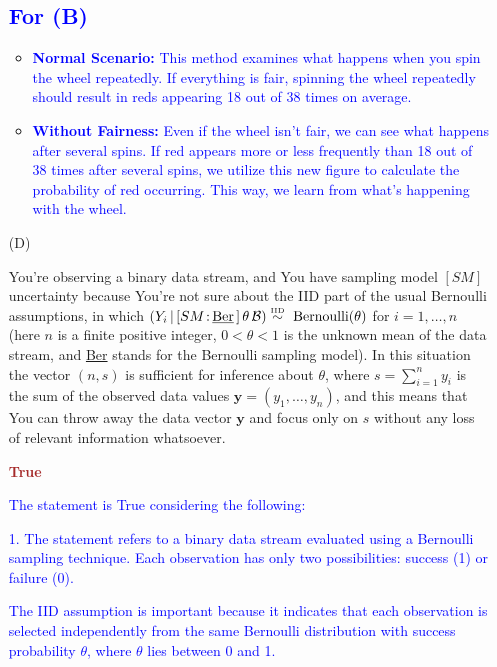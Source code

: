 \documentclass[12pt]{article}
\newcommand{\given}{\, | \,}
\renewcommand{\r}[1]{\text{#1}}
\renewcommand{\u}[1]{\underline{#1}}
\begin{document}
\begin{itemize}
\subsection*{\textcolor{blue}{\textbf{For (B)}}}

\begin{itemize}
    \item \textbf{\textcolor{blue}{Normal Scenario:}} \textcolor{blue}{This method examines what happens when you spin the wheel repeatedly. If everything is fair, spinning the wheel repeatedly should result in reds appearing 18 out of 38 times on average.}
    \item \textbf{\textcolor{blue}{Without Fairness:}} \textcolor{blue}{Even if the wheel isn't fair, we can see what happens after several spins. If red appears more or less frequently than 18 out of 38 times after several spins, we utilize this new figure to calculate the probability of red occurring. This way, we learn from what's happening with the wheel.}
\end{itemize} 

\item[(D)]

You're observing a binary data stream, and You have sampling model $[ SM ]$ uncertainty because You're not sure about the IID part of the usual Bernoulli assumptions, in which $( Y_i \given [ SM \colon \! \r{\u{Ber}} \, ] \, \theta \, \mathcal B ) \stackrel{ \textrm{\tiny IID} }{ \sim } \textrm{ Bernoulli} ( \theta )$ for $i = 1, \dots, n$ (here $n$ is a finite positive integer, $0 < \theta < 1$ is the unknown mean of the data stream, and \u{Ber} stands for the Bernoulli sampling model). In this situation the vector $( n, s )$ is sufficient for inference about $\theta$, where $s = \sum_{ i = 1 }^n y_i$ is the sum of the observed data values $\bm{ y } = ( y_1, \dots, y_n )$, and this means that You can throw away the data vector $\bm{ y }$ and focus only on $s$ without any loss of relevant information whatsoever.



\textcolor{brown}{\textbf{True}}

\textcolor{blue}{The statement is True considering the following:}

\textcolor{blue}{1. The statement refers to a binary data stream evaluated using a Bernoulli sampling technique. Each observation has only two possibilities: success (1) or failure (0).}

\textcolor{blue}{The IID assumption is important because it indicates that each observation is selected independently from the same Bernoulli distribution with success probability $\theta$, where $\theta$ lies between 0 and 1.}


\end{itemize}
\end{document}
